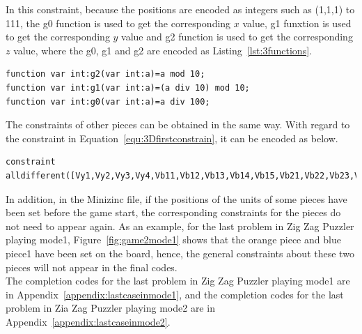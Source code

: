 \bigskip
\smallbreak
In this constraint, because the positions are encoded as integers such as (1,1,1) to 111, the g0 function is used to get the corresponding $x$ value, g1 funxtion is used to get the corresponding $y$ value and g2 function is used to get the corresponding $z$ value, where the g0, g1 and g2 are encoded as Listing~\ref{lst:3functions}.
\begin{lstlisting}[language=minizinc,numbers=none,caption={Encoding for 3Dblue piece1},label={lst:3functions}]
function var int:g2(var int:a)=a mod 10;
function var int:g1(var int:a)=(a div 10) mod 10;
function var int:g0(var int:a)=a div 100;
\end{lstlisting}
\bigskip
\smallbreak
The constraints of other pieces can be obtained in the same way. With regard to the constraint in Equation~\ref{equ:3Dfirstconstrain}, it can be encoded as below.
\begin{lstlisting}[language=minizinc,numbers=none,caption={Encoding for constraint two},label={lst:3Dalldifferent}]
constraint alldifferent([Vy1,Vy2,Vy3,Vy4,Vb11,Vb12,Vb13,Vb14,Vb15,Vb21,Vb22,Vb23,Vb24,Vb25,Vg11,Vg12,Vg13,Vg14,Vg21,Vg22,Vg23,Vr11,Vr12,Vr13,Vr21,Vr22,Vr23,Vo1,Vo2,Vo3,Vo4,Vp1,Vp2,Vp3,Vp4]);
\end{lstlisting}
\bigskip
\smallbreak
In addition, in the Minizinc file, if the positions of the units of some pieces have been set before the game start, the corresponding constraints for the pieces do not need to appear again. As an example, for the last problem in Zig Zag Puzzler playing mode1, Figure~\ref{fig:game2mode1} shows that the orange piece and blue piece1 have been set on the board, hence, the general constraints about these two pieces will not appear in the final codes.
\\The completion codes for the last problem in Zig Zag Puzzler playing mode1 are in Appendix~\ref{appendix:lastcaseinmode1}, and the completion codes for the last problem in Zia Zag Puzzler playing mode2 are in Appendix~\ref{appendix:lastcaseinmode2}. 